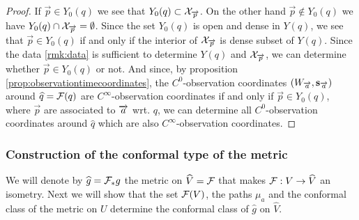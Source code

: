 \begin{proof}
    If $\overrightarrow{p}\in Y_0(q)$ we see that $Y_0(q) \subset \mc{X}_{\overrightarrow{p}}$. On the other hand $\overrightarrow{p}\notin Y_0(q)$ we have $Y_0(q) \cap \mc{X}_{\overrightarrow{p}} =\emptyset$. Since the set $Y_0(q)$ is open and dense in $Y(q)$, we see that $\overrightarrow{p}\in Y_0(q)$ if and only if the interior of $\mc{X}_{\overrightarrow{p}}$ is dense subset of $Y(q)$. Since the data \ref{rmk:data} is sufficient to determine $Y(q)$ and $\mc{X}_{\overrightarrow{p}}$, we can determine whether $\overrightarrow{p}\in Y_0(q)$ or not. And since, by proposition \ref{prop:observationtimecoordinates}, the $C^0$-observation coordinates $(W_\aa,\mathbf{s}_\aa)$ around $\widehat{q}=\F(q)$ are $C^\infty$-observation coordinates if and only if $\overrightarrow{p}\in Y_0(q)$, where $\overrightarrow{p}$ are associated to $\aa$ wrt. $q$, we can determine all $C^0$-observation coordinates around $\widehat{q}$ which are also $C^\infty$-observation coordinates.
\end{proof}

\subsubsection{Construction of the conformal type of the metric}
We will denote by $\widehat{g}=\F_*g$ the metric on $\widehat{V}=\F$ that makes $\F:V\to \widehat{V}$ an isometry. Next we will show that the set $\F(V)$, the paths $\mu_a$ and the conformal class of the metric on $U$ determine the conformal class of $\widehat{g}$ on $\widehat{V}$.

